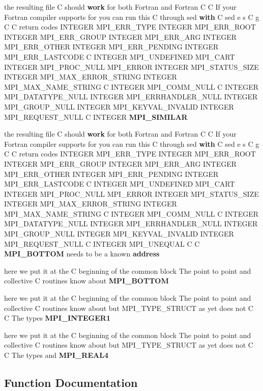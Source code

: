 \begin{CompactItemize}
\item 
the resulting file C should {\bf work} for both Fortran and Fortran C C If your Fortran compiler supports for you can run this C through sed {\bf with} C sed e s C g C C return codes INTEGER MPI\_\-ERR\_\-TYPE INTEGER MPI\_\-ERR\_\-ROOT INTEGER MPI\_\-ERR\_\-GROUP INTEGER MPI\_\-ERR\_\-ARG INTEGER MPI\_\-ERR\_\-OTHER INTEGER MPI\_\-ERR\_\-PENDING INTEGER MPI\_\-ERR\_\-LASTCODE C INTEGER MPI\_\-UNDEFINED MPI\_\-CART INTEGER MPI\_\-PROC\_\-NULL MPI\_\-ERROR INTEGER MPI\_\-STATUS\_\-SIZE INTEGER MPI\_\-MAX\_\-ERROR\_\-STRING INTEGER MPI\_\-MAX\_\-NAME\_\-STRING C INTEGER MPI\_\-COMM\_\-NULL C INTEGER MPI\_\-DATATYPE\_\-NULL INTEGER MPI\_\-ERRHANDLER\_\-NULL INTEGER MPI\_\-GROUP\_\-NULL INTEGER MPI\_\-KEYVAL\_\-INVALID INTEGER MPI\_\-REQUEST\_\-NULL C INTEGER {\bf MPI\_\-SIMILAR}
\item 
the resulting file C should {\bf work} for both Fortran and Fortran C C If your Fortran compiler supports for you can run this C through sed {\bf with} C sed e s C g C C return codes INTEGER MPI\_\-ERR\_\-TYPE INTEGER MPI\_\-ERR\_\-ROOT INTEGER MPI\_\-ERR\_\-GROUP INTEGER MPI\_\-ERR\_\-ARG INTEGER MPI\_\-ERR\_\-OTHER INTEGER MPI\_\-ERR\_\-PENDING INTEGER MPI\_\-ERR\_\-LASTCODE C INTEGER MPI\_\-UNDEFINED MPI\_\-CART INTEGER MPI\_\-PROC\_\-NULL MPI\_\-ERROR INTEGER MPI\_\-STATUS\_\-SIZE INTEGER MPI\_\-MAX\_\-ERROR\_\-STRING INTEGER MPI\_\-MAX\_\-NAME\_\-STRING C INTEGER MPI\_\-COMM\_\-NULL C INTEGER MPI\_\-DATATYPE\_\-NULL INTEGER MPI\_\-ERRHANDLER\_\-NULL INTEGER MPI\_\-GROUP\_\-NULL INTEGER MPI\_\-KEYVAL\_\-INVALID INTEGER MPI\_\-REQUEST\_\-NULL C INTEGER MPI\_\-UNEQUAL C C {\bf MPI\_\-BOTTOM} needs to be a known {\bf address}
\item 
here we put it at the C beginning of the common block The point to point and collective C routines know about {\bf MPI\_\-BOTTOM}
\item 
here we put it at the C beginning of the common block The point to point and collective C routines know about but MPI\_\-TYPE\_\-STRUCT as yet does not C C The types {\bf MPI\_\-INTEGER1}
\item 
here we put it at the C beginning of the common block The point to point and collective C routines know about but MPI\_\-TYPE\_\-STRUCT as yet does not C C The types and {\bf MPI\_\-REAL4}
\end{CompactItemize}


\subsection{Function Documentation}
